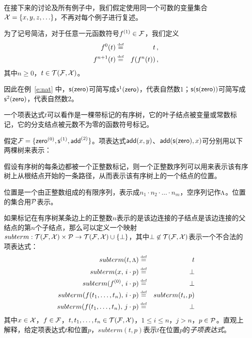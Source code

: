 在接下来的讨论及所有例子中，我们假定使用同一个可数的变量集合$\cX=\{x,y,z,\ldots\}$，不再对每个例子进行复述。

为了记号简洁，对于任意一元函数符号$f^{(1)}\in\cF$，我们定义
\begin{eqnarray}
    f^0(t) & \defeq & t \, ,     \nonumber \\
    f^{n+1}(t) & \defeq & f(f^n(t)) \, ,\nonumber 
\end{eqnarray}
其中$n\ge 0$，$t\in\TFX$。

因此在例~\ref{e:nat} 中，$\s(\zero)$可简写成$\s^1(\zero)$，代表自然数$1$；$\s(\s(\zero))$可简写成$\s^2(\zero)$，代表自然数$2$。

一个项表达式$t$可以看作是一棵带标记的有序树，它的叶子结点被变量或常数标记，它的分支结点被元数不为零的函数符号标记。

\begin{example}
\label{e:term-tree}
假定$\cF = \{\zero^{(0)}, \s^{(1)}, \add^{(2)}\}$。项表达式$\add(x,y)$、$\add(\s(\zero), x)$可分别用以下两棵树来表示：

\medskip
\centering
{}
\end{example}

假设有序树的每条边都被一个正整数标记，则一个正整数序列可以用来表示该有序树上从根结点开始的一条路径，从而表示该有序树上的一个结点的位置。

\begin{definition}[位置]
位置是一个由正整数组成的有限序列，表示成$n_1\cdot n_2\cdot\ldots\cdot n_m$，空序列记作$\rootp$。位置的集合用$\cP$表示。
\end{definition}

如果标记在有序树某条边上的正整数$n$表示的是该边连接的子结点是该边连接的父结点的第$n$个子结点，那么可以定义一个映射$subterm : \TFX \times \cP \ra \TFX\cup\{\bot\}$，其中$\bot\not\in\TFX$表示一个不合法的项表达式：
\begin{eqnarray}
  subterm(t, \rootp) & \defeq & t  \nonumber \\
  subterm(x,\, i\cdot p) & \defeq & \bot  \nonumber \\
  subterm(f^{(0)},\, i\cdot p) & \defeq & \bot  \nonumber \\
  subterm(f(t_1,\ldots,t_n),\, i\cdot p) & \defeq & subterm(t_i, p) \nonumber \\
  subterm(f(t_1,\ldots,t_n),\, j\cdot p) & \defeq & \bot \nonumber
\end{eqnarray}
其中$x\in\cX$，$f\in\cF$，$t,t_1,\ldots,t_n\in\TFX$，$1\le i\le n$，$j > n$，$p\in\cP$。直观上解释，给定项表达式$t$和位置$p$，$subterm(t,p)$表示$t$在位置$p$的\emph{子项表达式}。


